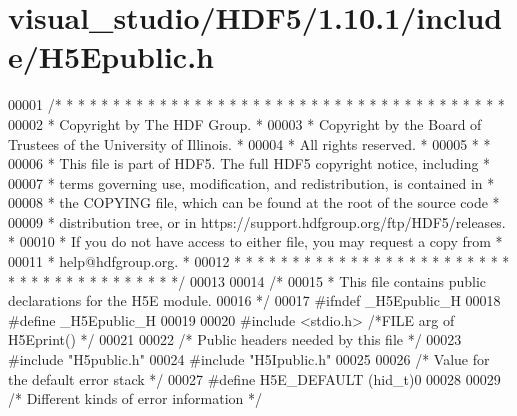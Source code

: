 \hypertarget{visual__studio_2_h_d_f5_21_810_81_2include_2_h5_epublic_8h_source}{}\section{visual\+\_\+studio/\+H\+D\+F5/1.10.1/include/\+H5\+Epublic.h}
\label{visual__studio_2_h_d_f5_21_810_81_2include_2_h5_epublic_8h_source}

\begin{DoxyCode}
00001 \textcolor{comment}{/* * * * * * * * * * * * * * * * * * * * * * * * * * * * * * * * * * * * * * *}
00002 \textcolor{comment}{ * Copyright by The HDF Group.                                               *}
00003 \textcolor{comment}{ * Copyright by the Board of Trustees of the University of Illinois.         *}
00004 \textcolor{comment}{ * All rights reserved.                                                      *}
00005 \textcolor{comment}{ *                                                                           *}
00006 \textcolor{comment}{ * This file is part of HDF5.  The full HDF5 copyright notice, including     *}
00007 \textcolor{comment}{ * terms governing use, modification, and redistribution, is contained in    *}
00008 \textcolor{comment}{ * the COPYING file, which can be found at the root of the source code       *}
00009 \textcolor{comment}{ * distribution tree, or in https://support.hdfgroup.org/ftp/HDF5/releases.  *}
00010 \textcolor{comment}{ * If you do not have access to either file, you may request a copy from     *}
00011 \textcolor{comment}{ * help@hdfgroup.org.                                                        *}
00012 \textcolor{comment}{ * * * * * * * * * * * * * * * * * * * * * * * * * * * * * * * * * * * * * * */}
00013 
00014 \textcolor{comment}{/*}
00015 \textcolor{comment}{ * This file contains public declarations for the H5E module.}
00016 \textcolor{comment}{ */}
00017 \textcolor{preprocessor}{#ifndef \_H5Epublic\_H}
00018 \textcolor{preprocessor}{#define \_H5Epublic\_H}
00019 
00020 \textcolor{preprocessor}{#include <stdio.h>}              \textcolor{comment}{/*FILE arg of H5Eprint()                     */}
00021 
00022 \textcolor{comment}{/* Public headers needed by this file */}
00023 \textcolor{preprocessor}{#include "H5public.h"}
00024 \textcolor{preprocessor}{#include "H5Ipublic.h"}
00025 
00026 \textcolor{comment}{/* Value for the default error stack */}
00027 \textcolor{preprocessor}{#define H5E\_DEFAULT             (hid\_t)0}
00028 
00029 \textcolor{comment}{/* Different kinds of error information */}

\end{DoxyCode}
